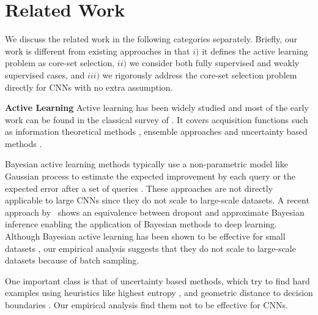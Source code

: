 \documentclass{article} %
\begin{document}
\section{Related Work} We discuss the related work in the following categories
separately. Briefly, our work is different from existing approaches in that $i)$
it defines the active learning problem as core-set selection, $ii)$ we consider
both fully supervised and weakly supervised cases, and $ iii)$ we rigorously
address the core-set selection problem directly for CNNs with no extra
assumption. 


\noindent\textbf{Active Learning} Active learning has been widely studied and
most of the early work can be found in the classical survey
of \citet{settles2010active}. It covers acquisition functions such as
information theoretical methods \citep{mackay1992information}, ensemble
approaches \citep{mccallumzy1998employing, freund1997selective} and uncertainty
based methods
\citep{tong2001support,joshi2009multi,li2013adaptive}.

Bayesian active learning methods typically use a non-parametric model like
Gaussian process to estimate the expected improvement by each query
\citep{kapoor2007active} or the expected error after a set of queries
\citep{roy2001toward}. These approaches are not directly applicable to large CNNs since they do not scale to large-scale datasets. A recent approach by~\citet{gal_bayes} shows an equivalence between dropout and approximate
Bayesian inference enabling the application of Bayesian methods to deep
learning. Although Bayesian active learning has been shown to be effective
for small datasets \citep{gal_active}, our empirical analysis suggests that they do not scale to large-scale datasets because of batch sampling.

One important class is that of uncertainty based methods, which try to find hard
examples using heuristics like highest entropy \citep{joshi2009multi}, and
geometric distance to decision boundaries
\citep{tong2001support,brinker2003incorporating}. Our empirical analysis find them not to be effective for CNNs.
\end{document}
